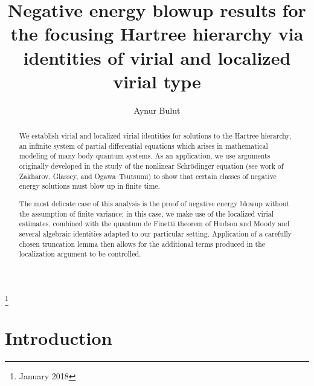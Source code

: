 \documentclass[reqno]{amsart}
\title[Negative energy blowup for the Hartree hierarchy]{Negative energy blowup results for the focusing Hartree hierarchy via identities of virial and localized virial type}
\author{Aynur Bulut}
\numberwithin{equation}{section}
\theoremstyle{remark}
\begin{document}
\begin{abstract}
We establish virial and localized virial identities for solutions to the Hartree hierarchy, an infinite system of partial differential equations which arises in mathematical modeling of many body quantum systems.  As an application, we use arguments originally developed in the study of the nonlinear Schr\"odinger equation (see work of Zakharov, Glassey, and Ogawa--Tsutsumi) to show that certain classes of negative energy solutions must blow up in finite time.  

The most delicate case of this analysis is the proof of negative energy blowup without the assumption of finite variance; in this case, we make use of the localized virial estimates, combined with the quantum de Finetti theorem of Hudson and Moody and several algebraic identities adapted to our particular setting.  Application of a carefully chosen truncation lemma then allows for the additional terms produced in the localization argument to be controlled.
\end{abstract}
\thanks{January 2018}
\maketitle
\tableofcontents
\section{Introduction}
\end{document}
